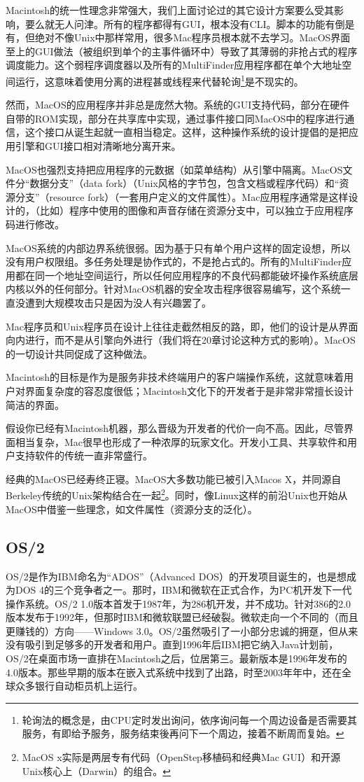 \documentclass[12pt,oneside]{book}
\begin{document}
Macintosh的统一性理念非常强大，我们上面讨论过的其它设计方案要么受其影响，要么就无人问津。所有的程序都得有GUI，根本没有CLI。脚本的功能有倒是有，但绝对不像Unix中那样常用，很多Mac程序员根本就不去学习。MacOS界面至上的GUI做法（被组织到单个的主事件循环中）导致了其薄弱的非抢占式的程序调度能力。这个弱程序调度器以及所有的MultiFinder应用程序都在单个大地址空间运行，这意味着使用分离的进程甚或线程来代替轮询\footnote{轮询法的概念是，由CPU定时发出询问，依序询问每一个周边设备是否需要其服务，有即给予服务，服务结束後再问下一个周边，接着不断周而复始。}是不现实的。

然而，MacOS的应用程序并非总是庞然大物。系统的GUI支持代码，部分在硬件自带的ROM实现，部分在共享库中实现，通过事件接口同MacOS中的程序进行通信，这个接口从诞生起就一直相当稳定。这样，这种操作系统的设计提倡的是把应用引擎和GUI接口相对清晰地分离开来。

MacOS也强烈支持把应用程序的元数据（如菜单结构）从引擎中隔离。MacOS文件分“数据分支”（data fork）（Unix风格的字节包，包含文档或程序代码）和“资源分支”（resource fork）（一套用户定义的文件属性）。Mac应用程序通常是这样设计的，（比如）程序中使用的图像和声音存储在资源分支中，可以独立于应用程序码进行修改。

MacOS系统的内部边界系统很弱。因为基于只有单个用户这样的固定设想，所以没有用户权限组。多任务处理是协作式的，不是抢占式的。所有的MultiFinder应用都在同一个地址空间运行，所以任何应用程序的不良代码都能破坏操作系统底层内核以外的任何部分。针对MacOS机器的安全攻击程序很容易编写，这个系统一直没遭到大规模攻击只是因为没人有兴趣罢了。

Mac程序员和Unix程序员在设计上往往走截然相反的路，即，他们的设计是从界面向内进行，而不是从引擎向外进行（我们将在20章讨论这种方式的影响）。MacOS的一切设计共同促成了这种做法。

Macintosh的目标是作为是服务非技术终端用户的客户端操作系统，这就意味着用户对界面复杂度的容忍度很低；Macintosh文化下的开发者于是非常非常擅长设计简洁的界面。

假设你已经有Macintosh机器，那么晋级为开发者的代价一向不高。因此，尽管界面相当复杂，Mac很早也形成了一种浓厚的玩家文化。开发小工具、共享软件和用户支持软件的传统一直非常盛行。

经典的MacOS已经寿终正寝。MacOS大多数功能已被引入Macos X，并同源自Berkeley传统的Unix架构结合在一起\footnote{MacOS x实际是两层专有代码（OpenStep移植码和经典Mac GUI）和开源Unix核心上（Darwin）的组合。}。同时，像Linux这样的前沿Unix也开始从MacOS中借鉴一些理念，如文件属性（资源分支的泛化）。


\subsection{OS/2}
OS/2是作为IBM命名为“ADOS”（Advanced DOS）的开发项目诞生的，也是想成为DOS 4的三个竞争者之一。那时，IBM和微软在正式合作，为PC机开发下一代操作系统。OS/2 1.0版本首发于1987年，为286机开发，并不成功。针对386的2.0版本发布于1992年，但那时IBM和微软联盟已经破裂。微软走向一个不同的（而且更赚钱的）方向——Windows 3.0。OS/2虽然吸引了一小部分忠诚的拥趸，但从来没有吸引到足够多的开发者和用户。直到1996年后IBM把它纳入Java计划前，OS/2在桌面市场一直排在Macintosh之后，位居第三。最新版本是1996年发布的4.0版本。那些早期的版本在嵌入式系统中找到了出路，时至2003年年中，还在全球众多银行自动柜员机上运行。
\end{document}
